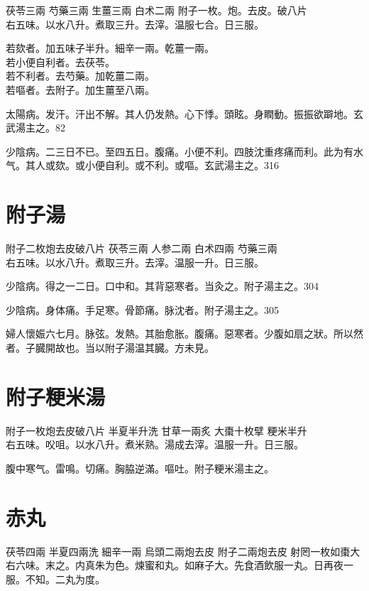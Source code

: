 茯苓{\scriptsize 三兩} 芍藥{\scriptsize 三兩} 生薑{\scriptsize 三兩} 白术{\scriptsize 二兩} 附子{\scriptsize 一枚。炮。去皮。破八片}\\
右五味。以水八升。煮取三升。去滓。温服七合。日三服。

若欬者。加五味子半升。細辛一兩。乾薑一兩。\\
若小便自利者。去茯苓。\\
若不利者。去芍藥。加乾薑二兩。\\
若嘔者。去附子。加生薑至八兩。

太陽病。发汗。汗出不解。其人仍发熱。心下悸。頭眩。身瞤動。振振欲躃地。玄武湯主之。82

少陰病。二三日不已。至四五日。腹痛。小便不利。四肢沈重疼痛而利。此为有水气。其人或欬。或小便{\khaaitp 自}利。或不利。或嘔。玄武湯主之。316

\section{附子湯}

附子{\scriptsize 二枚炮去皮破八片} 茯苓{\scriptsize 三兩} 人参{\scriptsize 二兩} 白术{\scriptsize 四兩} 芍藥{\scriptsize 三兩}\\
右五味。以水八升。煮取三升。去滓。温服一升。日三服。

少陰病。得之一二日。口中和。其背惡寒者。当灸之。附子湯主之。304

少陰病。身体痛。手足寒。骨節痛。脉沈者。附子湯主之。305

婦人懷娠六七月。脉弦。发熱。其胎愈胀。腹痛。惡寒者。少腹如扇之狀。所以然者。子臓開故也。当以附子湯温其臓。{\scriptsize 方未見。}

\section{附子粳米湯}

附子{\scriptsize 一枚炮去皮破八片} 半夏{\scriptsize 半升洗} 甘草{\scriptsize 一兩炙} 大棗{\scriptsize 十枚擘} 粳米{\scriptsize 半升}\\
右五味。㕮咀。以水八升。煮米熟。湯成去滓。温服一升。日三服。

腹中寒气。雷鳴。切痛。胸脇逆滿。嘔吐。附子粳米湯主之。

\section{赤丸}

茯苓{\scriptsize 四兩} 半夏{\scriptsize 四兩洗} 細辛{\scriptsize 一兩} 烏頭{\scriptsize 二兩炮去皮} 附子{\scriptsize 二兩炮去皮} 射罔{\scriptsize 一枚如棗大}\\
右六味。末之。内真朱为色。煉蜜和丸。如麻子大。先食酒飲服一丸。日再夜一服。不知。二丸为度。

